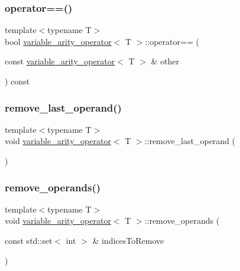 \subsubsection{\texorpdfstring{operator==()}{operator==()}}
{\footnotesize\ttfamily template$<$typename T$>$ \\
bool \mbox{\hyperlink{classvariable__arity__operator}{variable\+\_\+arity\+\_\+operator}}$<$ T $>$\+::operator== (\begin{DoxyParamCaption}\item[{const \mbox{\hyperlink{classvariable__arity__operator}{variable\+\_\+arity\+\_\+operator}}$<$ T $>$ \&}]{other }\end{DoxyParamCaption}) const\hspace{0.3cm}{\ttfamily [inline]}}

\mbox{\label{classvariable__arity__operator_ac124c2f286a72e65b3fb81d92bf1b557}} 
\subsubsection{\texorpdfstring{remove\_last\_operand()}{remove\_last\_operand()}}
{\footnotesize\ttfamily template$<$typename T$>$ \\
void \mbox{\hyperlink{classvariable__arity__operator}{variable\+\_\+arity\+\_\+operator}}$<$ T $>$\+::remove\+\_\+last\+\_\+operand (\begin{DoxyParamCaption}{ }\end{DoxyParamCaption})\hspace{0.3cm}{\ttfamily [inline]}}

\mbox{\label{classvariable__arity__operator_a6695e38c33b73a8c61db982d4ab6fa1d}} 
\subsubsection{\texorpdfstring{remove\_operands()}{remove\_operands()}}
{\footnotesize\ttfamily template$<$typename T$>$ \\
void \mbox{\hyperlink{classvariable__arity__operator}{variable\+\_\+arity\+\_\+operator}}$<$ T $>$\+::remove\+\_\+operands (\begin{DoxyParamCaption}\item[{const std\+::set$<$ int $>$ \&}]{indices\+To\+Remove }\end{DoxyParamCaption})\hspace{0.3cm}{\ttfamily [inline]}}

